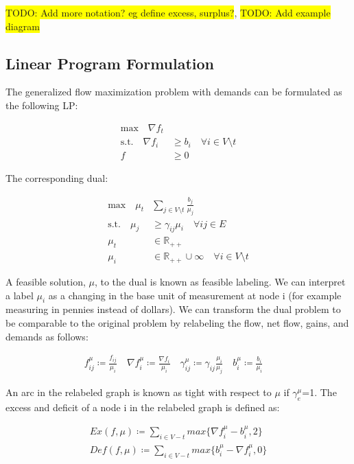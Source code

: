 \documentclass{article}
\newcommand{\todo}[1]{\colorbox{yellow}{TODO: #1}}
\begin{document}
    \todo{Add more notation? eg define excess, surplus?}, \todo{Add example diagram}
    
    \subsection{Linear Program Formulation}
    \label{sec:lp}
    
    The generalized flow maximization problem with demands can be formulated as the following LP:
    
        \begin{align*}\tag{P}
        \text{max} \quad
        \nabla f_t& \\
        \text{s.t.} \quad
        \nabla f_i &\geq b_i \quad \forall i \in V \setminus t \\
        f &\geq 0
        \end{align*}        

\noindent The corresponding dual:
 
        \begin{align*}\tag{D}
        \text{max} \quad
        \mu_t &\sum_{j \in V \setminus t} \frac{b_j}{\mu_j}  \\
        \text{s.t.} \quad
        \mu_j &\geq \gamma_{ij}\mu_i \quad \forall ij \in E \\
        \mu_t &\in \mathbb{R}_{++} \\
        \mu_i &\in \mathbb{R}_{++} \cup \infty \quad \forall i \in V \setminus t
        \end{align*}  
        
A feasible solution, $\mu$, to the dual is known as feasible labeling. We can interpret a label $\mu_i$ as a changing in the base unit of measurement  at node i (for example measuring in pennies instead of dollars). We can transform the dual problem to be comparable to the original problem by relabeling the flow, net flow, gains, and demands as follows:

\begin{align*}
f_{ij}^\mu \coloneqq \frac{f_{ij}}{\mu_i} \quad
\nabla f_i^\mu \coloneqq \frac{\nabla f_i }{\mu_i} \quad
\gamma_{ij}^\mu \coloneqq \gamma_{ij} \frac{\mu_i}{\mu_j} \quad
b_i^\mu \coloneqq \frac{b_i}{\mu_i} \quad
\end{align*}

An arc in the relabeled graph is known as tight with respect to $\mu$ if $\gamma_e^\mu$=1. The excess and deficit of a node i in the relabeled graph is defined as:


\begin{align*}
Ex(f,\mu) \coloneqq \sum_{i \in V - t} max\{ \nabla	f_i^\mu - b_i^\mu, 2 \} \\
Def(f,\mu) \coloneqq \sum_{i \in V -t} max \{ b_i^\mu - \nabla f_i^\mu, 0\}
\end{align*}
\end{document}

